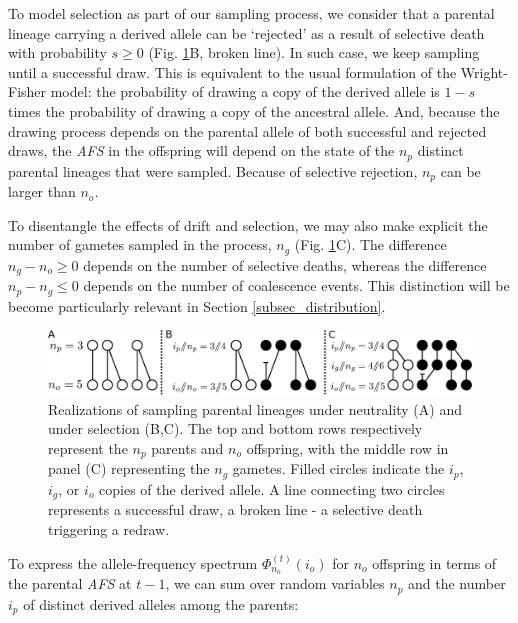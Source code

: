 \documentclass[review,nonatbib]{elsarticle}
\newcommand{\afs}[2]{\Phi_{#1}^{(#2)}}
\begin{document}
To model selection as part of our sampling process, we consider that a parental lineage carrying a
derived allele can be `rejected' as a result of selective death with probability $s\ge0$ (Fig.
\ref{fig_schematic}B, broken line). In such case, we keep sampling until a successful draw. This is
equivalent to the usual formulation of the Wright-Fisher model: the probability of drawing a copy of the
derived allele is $1-s$ times the probability of drawing a copy of the ancestral allele. And, because the drawing
process depends on the parental allele of both successful and rejected draws, the \textit{AFS} in the
offspring will depend on the state of the $n_p$ distinct parental lineages that were sampled. 
Because of selective rejection, $n_p$ can be larger than
$n_o$. 

To disentangle the effects of drift and selection, we may also make explicit the number of gametes
sampled in the process, $n_g$ (Fig. \ref{fig_schematic}C). The difference $n_g-n_o  \ge 0$
depends on the number of selective deaths, whereas the difference $n_p-n_g \le 0$ depends
on the number of coalescence events. This distinction will be become particularly relevant in Section
\ref{subsec_distribution}. 

\begin{figure}[h]
  \centering
  \includegraphics[width=1.0\textwidth]{fig/schematic.pdf}
  \caption{\label{fig_schematic} Realizations of sampling parental lineages under neutrality (A) and
    under selection (B,C). The top and bottom rows respectively represent the $n_p$ parents and
    $n_o$ offspring, with the middle row in panel (C) representing the $n_g$ gametes. Filled circles
    indicate the $i_p$, $i_g$, or $i_o$ copies of the derived allele. A line connecting two circles
    represents a successful draw, a broken line - a selective death triggering a redraw. }
\end{figure}

To express the allele-frequency spectrum $\afs{n_o}{t}(i_o)$ for $n_o$ offspring in terms of the parental
\textit{AFS} at $t-1$, we can sum over random variables $n_p$ and the number $i_p$ of distinct derived alleles
among the parents:
\end{document}
